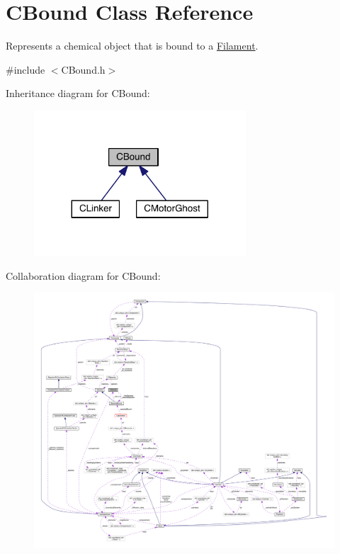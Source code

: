 \hypertarget{classCBound}{\section{C\+Bound Class Reference}
\label{classCBound}
}


Represents a chemical object that is bound to a \hyperlink{classFilament}{Filament}.  




{\ttfamily \#include $<$C\+Bound.\+h$>$}



Inheritance diagram for C\+Bound\+:\nopagebreak
\begin{figure}[H]
\begin{center}
\leavevmode
\includegraphics[width=224pt]{classCBound__inherit__graph}
\end{center}
\end{figure}


Collaboration diagram for C\+Bound\+:\nopagebreak
\begin{figure}[H]
\begin{center}
\leavevmode
\includegraphics[width=350pt]{classCBound__coll__graph}
\end{center}
\end{figure}
